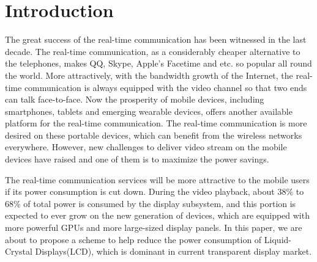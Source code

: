 \section{Introduction}


The great success of the real-time communication has been witnessed in
the last decade. The real-time communication, as a considerably
cheaper alternative to the telephones, makes QQ, Skype, Apple's
Facetime and etc. so popular all round the world. More attractively,
with the bandwidth growth of the Internet, the real-time communication
is always equipped with the video channel so that two ends can talk
face-to-face. Now the prosperity of mobile devices, including
smartphones, tablets and emerging wearable devices, offers another
available platform for the real-time communication. The real-time
communication is more desired on these portable devices, which can
benefit from the wireless networks everywhere. However, new challenges
to deliver video stream on the mobile devices have raised and one of
them is to maximize the power savings.

The real-time communication services will be more attractive to the
mobile users if its power consumption is cut down. During the video
playback, about 38\% to 68\% of total power is consumed by the display
subsystem, and this portion is expected to ever grow on the new
generation of devices, which are equipped with more powerful GPUs and
more large-sized display panels. In this paper, we are about to
propose a scheme to help reduce the power consumption of
Liquid-Crystal Displays(LCD), which is dominant in current transparent
display market.


